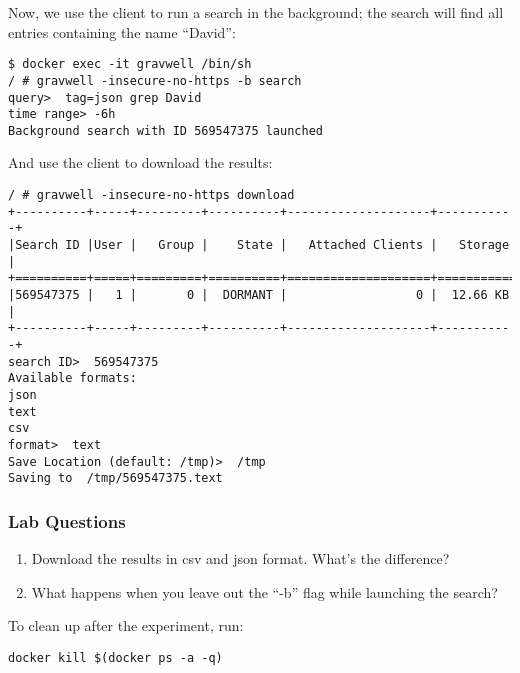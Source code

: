 Now, we use the client to run a search in the background; the search
will find all entries containing the name ``David'':

\begin{Verbatim}[breaklines=true]
$ docker exec -it gravwell /bin/sh
/ # gravwell -insecure-no-https -b search
query>  tag=json grep David
time range> -6h
Background search with ID 569547375 launched
\end{Verbatim}

And use the client to download the results:

\begin{Verbatim}[breaklines=true]
/ # gravwell -insecure-no-https download
+----------+-----+---------+----------+--------------------+-----------+
|Search ID |User |   Group |    State |   Attached Clients |   Storage |
+==========+=====+=========+==========+====================+===========+
|569547375 |   1 |       0 |  DORMANT |                  0 |  12.66 KB |
+----------+-----+---------+----------+--------------------+-----------+
search ID>  569547375
Available formats:
json
text
csv
format>  text
Save Location (default: /tmp)>  /tmp
Saving to  /tmp/569547375.text
\end{Verbatim}

\subsubsection{Lab Questions}

\begin{enumerate}
\item
  Download the results in csv and json format. What's the difference?
\item
  What happens when you leave out the ``-b'' flag while launching the
  search?
\end{enumerate}

To clean up after the experiment, run:

\begin{Verbatim}[breaklines=true]
docker kill $(docker ps -a -q)
\end{Verbatim}
